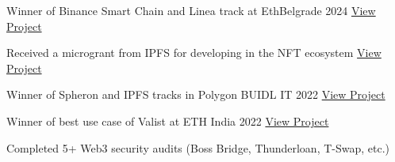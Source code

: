 \documentclass[letter,10pt]{article}
\begin{document}
\begin{zitemize}
    \item Winner of Binance Smart Chain and Linea track at EthBelgrade 2024 \hfill \href{https://t.co/V28cLMQW9K}{View Project}
    \item Received a microgrant from IPFS for developing in the NFT ecosystem \hfill \href{https://github.com/ipfs/devgrants/issues/272}{View Project}
    \item Winner of Spheron and IPFS tracks in Polygon BUIDL IT 2022 \hfill \href{https://devpost.com/software/moog3}{View Project}
    \item Winner of best use case of Valist at ETH India 2022 \hfill \href{https://ethglobal.com/showcase/duni-nu3g3}{View Project}
    \item Completed 5+ Web3 security audits (Boss Bridge, Thunderloan, T-Swap, etc.)
\end{zitemize}
\end{document}
